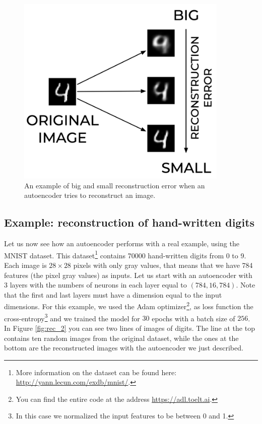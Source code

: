 \documentclass[12pt,a4]{article}
\begin{document}
\begin{figure}[hbt]
\centering
\includegraphics[width=10.12cm,height=9.16cm]{./images/image5.png}
\caption{An example of big and small reconstruction error when an autoencoder tries to reconstruct an image.}\label{fig:rec_err}
\end{figure}




\subsection{Example: reconstruction of hand-written digits}

Let us now see how an autoencoder performs with a real example, using the MNIST dataset. This dataset\footnote{ More information on the dataset can be found here: \url{http://yann.lecun.com/exdb/mnist/}. } contains 70000 hand-written digits from 0 to 9. Each image is \( 28\times 28\) pixels with only gray values, that means that we have 784 features (the pixel gray values) as inputs. Let us start with an autoencoder with 3 layers with the numbers of neurons in each layer equal to \(\left(784,16,784\right)\). Note that the first and last layers must have a dimension equal to the input dimensions. For this example, we used the Adam optimizer\footnote{ You can find the entire code at the address \url{https://adl.toelt.ai}. }, as loss function the cross-entropy\footnote{ In this case we normalized the input features to be between 0 and 1.} and we trained the model for \( 30\) epochs with a batch size of \( 256\). In Figure  \ref{fig:rec_2} you can see two lines of images of digits. The line at the top contains ten random images from the original dataset, while the ones at the bottom are the reconstructed images with the autoencoder we just described.
\end{document}

